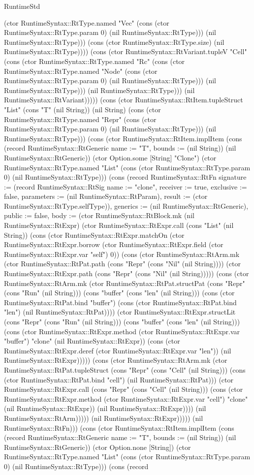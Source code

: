 \begin{lexlean}{RuntimeStd}
\begin{semanticmodule}
{(ctor RuntimeSyntax::RtType.named "Vec" (cons (ctor RuntimeSyntax::RtType.param 0) (nil RuntimeSyntax::RtType))) (nil RuntimeSyntax::RtType))) (cons (ctor RuntimeSyntax::RtType.size) (nil RuntimeSyntax::RtType)))) (cons (ctor RuntimeSyntax::RtVariant.tupleV "Cell" (cons (ctor RuntimeSyntax::RtType.named "Rc" (cons (ctor RuntimeSyntax::RtType.named "Node" (cons (ctor RuntimeSyntax::RtType.param 0) (nil RuntimeSyntax::RtType))) (nil RuntimeSyntax::RtType))) (nil RuntimeSyntax::RtType))) (nil RuntimeSyntax::RtVariant))))) (cons (ctor RuntimeSyntax::RtItem.tupleStruct "List" (cons "T" (nil String)) (nil String) (cons (ctor RuntimeSyntax::RtType.named "Repr" (cons (ctor RuntimeSyntax::RtType.param 0) (nil RuntimeSyntax::RtType))) (nil RuntimeSyntax::RtType))) (cons (ctor RuntimeSyntax::RtItem.implItem (cons (record RuntimeSyntax::RtGeneric {name := "T", bounds := (nil String)}) (nil RuntimeSyntax::RtGeneric)) (ctor Option.some [String] "Clone") (ctor RuntimeSyntax::RtType.named "List" (cons (ctor RuntimeSyntax::RtType.param 0) (nil RuntimeSyntax::RtType))) (cons (record RuntimeSyntax::RtFn {signature := (record RuntimeSyntax::RtSig {name := "clone", receiver := true, exclusive := false, parameters := (nil RuntimeSyntax::RtParam), result := (ctor RuntimeSyntax::RtType.selfType)}), generics := (nil RuntimeSyntax::RtGeneric), public := false, body := (ctor RuntimeSyntax::RtBlock.mk (nil RuntimeSyntax::RtExpr) (ctor RuntimeSyntax::RtExpr.call (cons "List" (nil String)) (cons (ctor RuntimeSyntax::RtExpr.matchOn (ctor RuntimeSyntax::RtExpr.borrow (ctor RuntimeSyntax::RtExpr.field (ctor RuntimeSyntax::RtExpr.var "self") 0)) (cons (ctor RuntimeSyntax::RtArm.mk (ctor RuntimeSyntax::RtPat.path (cons "Repr" (cons "Nil" (nil String)))) (ctor RuntimeSyntax::RtExpr.path (cons "Repr" (cons "Nil" (nil String))))) (cons (ctor RuntimeSyntax::RtArm.mk (ctor RuntimeSyntax::RtPat.structPat (cons "Repr" (cons "Run" (nil String))) (cons "buffer" (cons "len" (nil String))) (cons (ctor RuntimeSyntax::RtPat.bind "buffer") (cons (ctor RuntimeSyntax::RtPat.bind "len") (nil RuntimeSyntax::RtPat)))) (ctor RuntimeSyntax::RtExpr.structLit (cons "Repr" (cons "Run" (nil String))) (cons "buffer" (cons "len" (nil String))) (cons (ctor RuntimeSyntax::RtExpr.method (ctor RuntimeSyntax::RtExpr.var "buffer") "clone" (nil RuntimeSyntax::RtExpr)) (cons (ctor RuntimeSyntax::RtExpr.deref (ctor RuntimeSyntax::RtExpr.var "len")) (nil RuntimeSyntax::RtExpr))))) (cons (ctor RuntimeSyntax::RtArm.mk (ctor RuntimeSyntax::RtPat.tupleStruct (cons "Repr" (cons "Cell" (nil String))) (cons (ctor RuntimeSyntax::RtPat.bind "cell") (nil RuntimeSyntax::RtPat))) (ctor RuntimeSyntax::RtExpr.call (cons "Repr" (cons "Cell" (nil String))) (cons (ctor RuntimeSyntax::RtExpr.method (ctor RuntimeSyntax::RtExpr.var "cell") "clone" (nil RuntimeSyntax::RtExpr)) (nil RuntimeSyntax::RtExpr)))) (nil RuntimeSyntax::RtArm))))) (nil RuntimeSyntax::RtExpr))))}) (nil RuntimeSyntax::RtFn))) (cons (ctor RuntimeSyntax::RtItem.implItem (cons (record RuntimeSyntax::RtGeneric {name := "T", bounds := (nil String)}) (nil RuntimeSyntax::RtGeneric)) (ctor Option.none [String]) (ctor RuntimeSyntax::RtType.named "List" (cons (ctor RuntimeSyntax::RtType.param 0) (nil RuntimeSyntax::RtType))) (cons (record }
\end{semanticmodule}
\end{lexlean}
